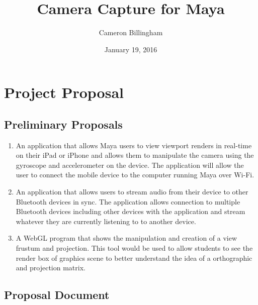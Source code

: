 \documentclass[11pt]{article}
\title{Camera Capture for Maya}
\author{Cameron Billingham}
\date{January 19, 2016}
\begin{document}
\maketitle


\pagebreak
\tableofcontents



\pagebreak


\section{Project Proposal}
\subsection{Preliminary Proposals}

\begin{enumerate}
\item
An application that allows Maya users to view viewport renders in real-time on their iPad or iPhone and allows them to manipulate the camera using the gyroscope and accelerometer on the device. The application will allow the user to connect the mobile device to the computer running Maya over Wi-Fi.
\item
An application that allows users to stream audio from their device to other Bluetooth devices in sync. The application allows connection to multiple Bluetooth devices including other devices with the application and stream whatever they are currently listening to to another device.
\item
A WebGL program that shows the manipulation and creation of a view frustum and projection. This tool would be used to allow students to see the render box of graphics scene to better understand the idea of a orthographic and projection matrix.
\end{enumerate}

\subsection{Proposal Document}



{}

\end{document}
